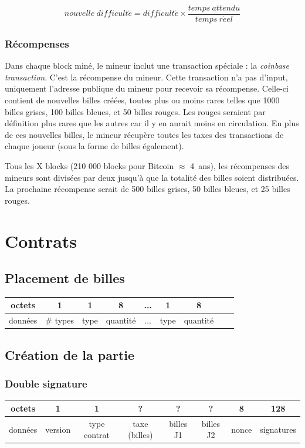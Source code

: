 \documentclass{article}
\begin{document}
\[ nouvelle\ difficult\acute{e} = difficult\acute{e} \times \frac{temps\ attendu}{temps\ r\acute{e}el} \]

\subsubsection{Récompenses}
Dans chaque block miné, le mineur inclut une transaction spéciale : la \textit{coinbase transaction}. C'est la récompense du mineur.
Cette transaction n'a pas d'input, uniquement l'adresse publique du mineur pour recevoir sa récompense.
Celle-ci contient de nouvelles billes créées, toutes plus ou moins rares telles que 1000 billes grises, 100 billes bleues, et 50 billes rouges. Les rouges seraient par définition plus rares que les autres car il y en aurait moins en circulation.
En plus de ces nouvelles billes, le mineur récupère toutes les taxes des transactions de chaque joueur (sous la forme de billes également).

Tous les X blocks (210 000 blocks pour Bitcoin $\approx$ 4\ ans), les récompenses des mineurs sont divisées par deux jusqu'à que la totalité des billes soient distribuées.
La prochaine récompense serait de 500 billes grises, 50 billes bleues, et 25 billes rouges.

\section{Contrats}
\subsection*{Placement de billes}
\hspace*{-1cm}%
\begin{tabular}{ |c|c|c|c|c|c|c|c|c| } 
 \hline
octets & 1 & 1 & 8 & ... & 1 & 8\\ 
 \hline
    données & \# types & type & quantité & ... & type & quantité \\ 
 \hline
\end{tabular}
\subsection{Création de la partie}
\subsubsection{Double signature}
\hspace*{-1cm}%
\begin{tabular}{ |c|c|c|c|c|c|c|c|} 
 \hline
 octets & 1 & 1 & ? & ? & ? & 8 & 128\\ 
 \hline
    données & version & type contrat & taxe (billes) & billes J1 & billes J2 & nonce & signatures\\ 
 \hline
\end{tabular}
\end{document}
